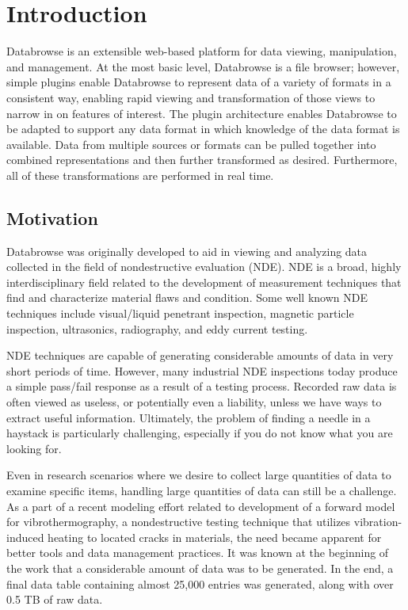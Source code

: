 \documentclass[10pt]{article}
\begin{document}
\clearpage
\section{Introduction}

Databrowse is an extensible web-based platform for data viewing, manipulation, and management.  At the most basic level, Databrowse is a file browser; however, simple plugins enable Databrowse to represent data of a variety of formats in a consistent way, enabling rapid viewing and transformation of those views to narrow in on features of interest.  The plugin architecture enables Databrowse to be adapted to support any data format in which knowledge of the data format is available.  Data from multiple sources or formats can be pulled together into combined representations and then further transformed as desired.  Furthermore, all of these transformations are performed in real time.

\subsection{Motivation}

Databrowse was originally developed to aid in viewing and analyzing data collected in the field of nondestructive evaluation (NDE).  NDE is a broad, highly interdisciplinary field related to the development of measurement techniques that find and characterize material flaws and condition.  Some well known NDE techniques include visual/liquid penetrant inspection, magnetic particle inspection, ultrasonics, radiography, and eddy current testing.  

NDE techniques are capable of generating considerable amounts of data in very short periods of time.  However, many industrial NDE inspections today produce a simple pass/fail response as a result of a testing process.  Recorded raw data is often viewed as useless, or potentially even a liability, unless we have ways to extract useful information.  Ultimately, the problem of finding a needle in a haystack is particularly challenging, especially if you do not know what you are looking for.

Even in research scenarios where we desire to collect large quantities of data to examine specific items, handling large quantities of data can still be a challenge.  As a part of a recent modeling effort related to development of a forward model for vibrothermography, a nondestructive testing technique that utilizes vibration-induced heating to located cracks in materials, the need became apparent for better tools and data management practices.  It was known at the beginning of the work that a considerable amount of data was to be generated.  In the end, a final data table containing almost 25,000 entries was generated, along with over 0.5 TB of raw data.  
\end{document}

